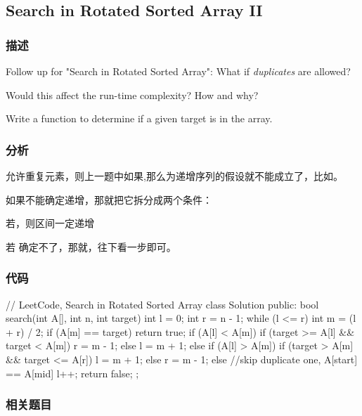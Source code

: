 \subsection{Search in Rotated Sorted Array II}
\label{sec:search-in-rotated-sorted-array-ii}


\subsubsection{描述}
Follow up for "Search in Rotated Sorted Array": What if \emph{duplicates} are allowed?

Would this affect the run-time complexity? How and why?

Write a function to determine if a given target is in the array.


\subsubsection{分析}
允许重复元素，则上一题中如果,那么\fn{[l,m]}为递增序列的假设就不能成立了，比如\code{[1,3,1,1,1]}。

如果不能确定递增，那就把它拆分成两个条件：
\begindot
\item 若，则区间\fn{[l,m]}一定递增
\item 若 确定不了，那就，往下看一步即可。
\myenddot

\subsubsection{代码}
\begin{Code}
// LeetCode, Search in Rotated Sorted Array
class Solution {
public:
    bool search(int A[], int n, int target) {
        int l = 0;
        int r = n - 1;
        while (l <= r) {
            int m = (l + r) / 2;
            if (A[m] == target)
                return true;
            if (A[l] < A[m]) {
                if (target >= A[l] && target < A[m])
                    r = m - 1;
                else
                    l = m + 1;
            } else if (A[l] > A[m]) {
                if (target > A[m] && target <= A[r])
                    l = m + 1;
                else
                    r = m - 1;
            } else
                //skip duplicate one, A[start] == A[mid]
                l++;
        }
        return false;
    }
};
\end{Code}


\subsubsection{相关题目}

